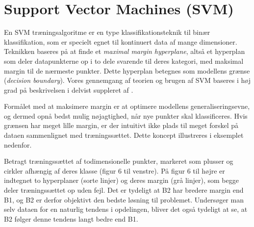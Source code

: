 \documentclass{article}
\begin{document}
\section{Support Vector Machines (SVM)}

En SVM træningsalgoritme er en type klassifikationsteknik til binær klassifikation, som er specielt egnet til kontinuert data af mange dimensioner. Teknikken baseres på at finde et \textit{maximal margin hyperplane}, altså et hyperplan som deler datapunkterne op i to dele svarende til deres kategori, med maksimal margin til de nærmeste punkter. Dette hyperplan betegnes som modellens grænse (\textit{decision boundary}). Vores gennemgang af teorien og brugen af SVM baseres i høj grad på beskrivelsen i \cite{data-mining} delvist suppleret af \cite{kernel-induced-feature-spaces}.

Formålet med at maksimere margin er at optimere modellens generaliseringsevne, og dermed opnå bedst mulig nøjagtighed, når nye punkter skal klassificeres. Hvis grænsen har meget lille margin, er der intuitivt ikke plads til meget forskel på dataen sammenlignet med træningssættet. Dette koncept illustreres i eksemplet nedenfor.

Betragt træningssættet af todimensionelle punkter, markeret som plusser og cirkler afhængig af deres klasse (figur 6 til venstre). På figur 6 til højre er indtegnet to hyperplaner (sorte linjer) og deres margin (grå linjer), som begge deler træningssættet op uden fejl. Det er tydeligt at B2 har bredere margin end B1, og B2 er derfor objektivt den bedste løsning til problemet. Undersøger man selv dataen for en naturlig tendens i opdelingen, bliver det også tydeligt at se, at B2 følger denne tendens langt bedre end B1.
\end{document}
